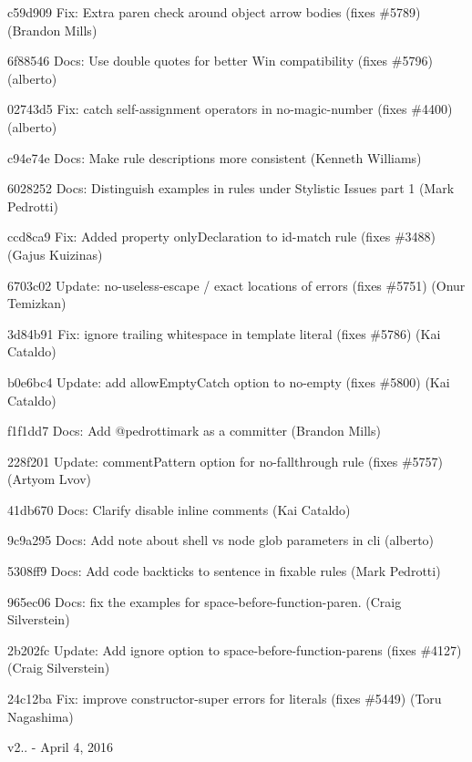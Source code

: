 \begin{DoxyItemize}
\item c59d909 Fix\+: Extra paren check around object arrow bodies (fixes \#5789) (Brandon Mills)
\item 6f88546 Docs\+: Use double quotes for better Win compatibility (fixes \#5796) (alberto)
\item 02743d5 Fix\+: catch self-\/assignment operators in {\ttfamily no-\/magic-\/number} (fixes \#4400) (alberto)
\item c94e74e Docs\+: Make rule descriptions more consistent (Kenneth Williams)
\item 6028252 Docs\+: Distinguish examples in rules under Stylistic Issues part 1 (Mark Pedrotti)
\item ccd8ca9 Fix\+: Added property only\+Declaration to id-\/match rule (fixes \#3488) (Gajus Kuizinas)
\item 6703c02 Update\+: no-\/useless-\/escape / exact locations of errors (fixes \#5751) (Onur Temizkan)
\item 3d84b91 Fix\+: ignore trailing whitespace in template literal (fixes \#5786) (Kai Cataldo)
\item b0e6bc4 Update\+: add allow\+Empty\+Catch option to no-\/empty (fixes \#5800) (Kai Cataldo)
\item f1f1dd7 Docs\+: Add @pedrottimark as a committer (Brandon Mills)
\item 228f201 Update\+: {\ttfamily comment\+Pattern} option for {\ttfamily no-\/fallthrough} rule (fixes \#5757) (Artyom Lvov)
\item 41db670 Docs\+: Clarify disable inline comments (Kai Cataldo)
\item 9c9a295 Docs\+: Add note about shell vs node glob parameters in cli (alberto)
\item 5308ff9 Docs\+: Add code backticks to sentence in fixable rules (Mark Pedrotti)
\item 965ec06 Docs\+: fix the examples for space-\/before-\/function-\/paren. (Craig Silverstein)
\item 2b202fc Update\+: Add ignore option to space-\/before-\/function-\/parens (fixes \#4127) (Craig Silverstein)
\item 24c12ba Fix\+: improve {\ttfamily constructor-\/super} errors for literals (fixes \#5449) (Toru Nagashima)
\end{DoxyItemize}

v2.. -\/ April 4, 2016


